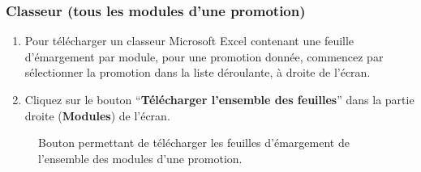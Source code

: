 \documentclass[letterpaper,10pt,french]{sphinxmanual}
\begin{document}
\subsubsection{Classeur (tous les modules d'une promotion)}
\label{prof:classeur-tous-les-modules-d-une-promotion}\begin{enumerate}
\item {} 
Pour télécharger un classeur Microsoft Excel contenant une feuille d'émargement par module, pour une promotion donnée, commencez par sélectionner la promotion dans la liste déroulante, à droite de l'écran.

\item {} 
Cliquez sur le bouton ``\textbf{Télécharger l'ensemble des feuilles}'' dans la partie droite (\textbf{Modules}) de l'écran.

\end{enumerate}
\begin{figure}[htbp]
\centering
\capstart

\caption{Bouton permettant de télécharger les feuilles d'émargement de l'ensemble des modules d'une promotion.}\end{figure}
\end{document}
